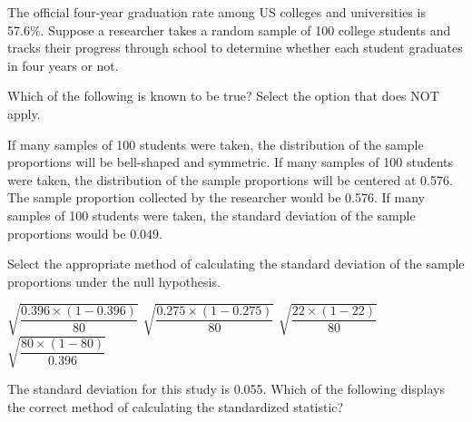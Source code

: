 \documentclass{exam}
\begin{document}
	\begin{questions}
		\question The official four-year graduation rate among US colleges and universities is 57.6\%. Suppose a researcher takes a random sample of 100 college students and tracks their progress through school to determine whether each student graduates in four years or not.
		
		Which of the following is known to be true? Select the option that does NOT apply.
						
		\begin{choices}
			\choice If many samples of 100 students were taken, the distribution of the sample proportions will be bell-shaped and symmetric.
			\choice If many samples of 100 students were taken, the distribution of the sample proportions will be centered at 0.576.
			\correctchoice The sample proportion collected by the researcher would be 0.576.
			\choice If many samples of 100 students were taken, the standard deviation of the sample proportions would be 0.049.
		\end{choices}
		
		
		\question Select the appropriate method of calculating the standard deviation of the sample proportions under the null hypothesis.
		
		\begin{oneparchoices}
			\correctchoice \(\sqrt{\dfrac{0.396 \times (1-0.396)}{80}}\)
			\choice \(\sqrt{\dfrac{0.275 \times (1-0.275)}{80}}\)
			\choice \(\sqrt{\dfrac{22 \times (1-22)}{80}}\)
			\choice \(\sqrt{\dfrac{80 \times (1-80)}{0.396}}\)
		\end{oneparchoices}
		
		\question The standard deviation for this study is 0.055. Which of the following displays the correct method of calculating the standardized statistic?
		

\end{questions}
\end{document}
